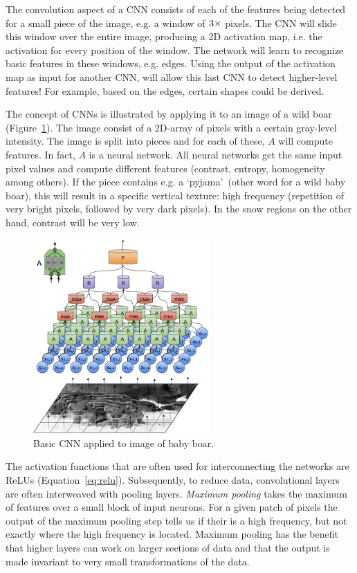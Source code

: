 The convolution aspect of a CNN consists of each of the features being detected for a small piece of the image, e.g. a window of $3\times\time 3$ pixels. The CNN will slide this window over the entire image, producing a 2D activation map, i.e. the activation for every position of the window. The network will learn to recognize basic features in these windows, e.g. edges. Using the output of the activation map as input for another CNN, will allow this last CNN to detect higher-level features! For example, based on the edges, certain shapes could be derived. 

The concept of CNNs is illustrated by applying it to an image of a wild boar (Figure~\ref{fig:pyjama}). The image consist of a 2D-array of pixels with a certain gray-level intensity. The image is split into pieces and for each of these, $A$ will compute features. In fact, $A$ is a neural network. All neural networks get the same input pixel values and compute different features (contrast, entropy, homogeneity among others). If the piece contains e.g. a \textquoteleft pyjama\textquoteright\   (other word for a wild baby boar), this will result in a specific vertical texture: high frequency (repetition of very bright pixels, followed by very dark pixels). In the snow regions on the other hand, contrast will be very low.

\begin{figure}[h]
	\centering
	\includegraphics[width=0.6\textwidth]{../figures/pyjama2}
	\caption{Basic CNN applied to image of baby boar. \label{fig:pyjama}}
\end{figure}

The activation functions that are often used for interconnecting the networks are ReLUs (Equation~\ref{eq:relu}). Subsequently, to reduce data, convolutional layers are often interweaved with pooling layers. \textit{Maximum pooling} takes the maximum of features over a small block of input neurons. For a given patch of pixels the output of the maximum pooling step tells us if their is a high frequency, but not exactly where the high frequency is located. Maximum pooling has the benefit that higher layers can work on larger sections of data and that the output is made invariant to very small transformations of the data.

